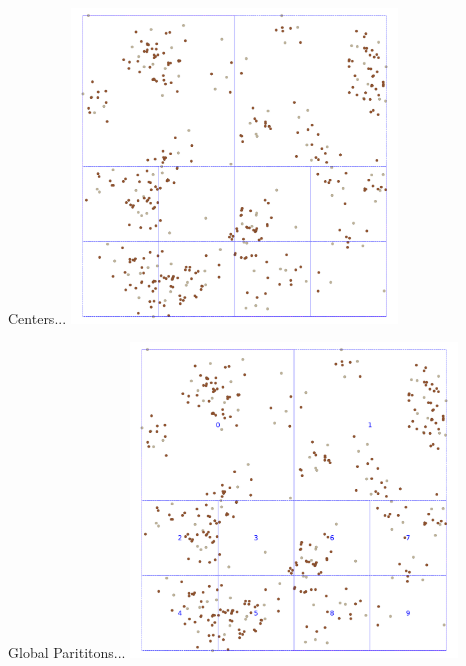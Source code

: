 \documentclass{beamer}
\begin{document}
\begin{frame}{Centers...}
    \centering
    \includegraphics[width=0.65\textwidth]{figures/03-Centers}
\end{frame}

\begin{frame}{Global Parititons...}
    \centering
    \includegraphics[width=0.65\textwidth]{figures/04-GPartitions}
\end{frame}
\end{document}
